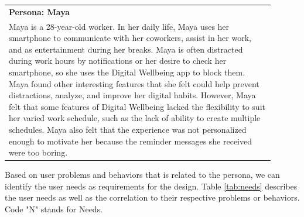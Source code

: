 \documentclass[conference]{IEEEtran}
\begin{document}
\RaggedLeft
\begin{table}[htbp]
  \begin{footnotesize}
    \begin{center}
      \begin{tabular}{|m{0.9\linewidth}|}
        \hline
      \textbf{Persona: Maya} \\
      Maya is a 28-year-old worker. In her daily life, Maya uses her smartphone to communicate with her coworkers, assist in her work, and as entertainment during her breaks. Maya is often distracted during work hours by notifications or her desire to check her smartphone, so she uses the Digital Wellbeing app to block them. Maya found other interesting features that she felt could help prevent distractions, analyze, and improve her digital habits. However, Maya felt that some features of Digital Wellbeing lacked the flexibility to suit her varied work schedule, such as the lack of ability to create multiple schedules. Maya also felt that the experience was not personalized enough to motivate her because the reminder messages she received were too boring. \\ \hline
    \end{tabular}
    \label{tab:problems}
  \end{center}
\end{footnotesize}
\end{table}
\justifying

Based on user problems and behaviors that is related to the persona, we can identify the user needs as requirements for the design. Table \ref{tab:needs} describes the user needs as well as the correlation to their respective problems or behaviors. Code "N" stands for Needs.
\end{document}
